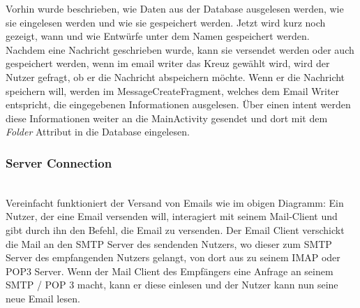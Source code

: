 \documentclass[a4paper,11pt]{article}
\begin{document}
\begingroup
\setlength{\intextsep}{5pt}
\setlength{\columnsep}{4pt}




\nohyphenation

Vorhin wurde beschrieben, wie Daten aus der Database ausgelesen werden, wie sie eingelesen werden und wie sie gespeichert werden. Jetzt wird kurz 
noch gezeigt, wann und wie Entwürfe unter dem Namen  gespeichert werden. \\

Nachdem eine Nachricht geschrieben wurde, kann sie versendet werden oder auch gespeichert werden, wenn im \gls{email writer} das Kreuz gewählt wird, wird der Nutzer 
gefragt, ob er die Nachricht abspeichern möchte. Wenn er die Nachricht speichern will, werden im MessageCreateFragment, welches dem Email Writer entspricht, die
eingegebenen Informationen ausgelesen. Über einen \gls{intent} werden diese Informationen weiter an die MainActivity gesendet und dort 
mit dem \textit{Folder} Attribut  in die Database eingelesen.\\

\endgroup

\vspace*{2cm}
\subsubsection{Server Connection}


\phantom{.} \\ %
Vereinfacht funktioniert der Versand von Emails wie im obigen Diagramm: Ein Nutzer, der eine Email versenden will, interagiert mit seinem Mail-Client und gibt durch ihn den Befehl, die Email zu versenden. Der Email Client verschickt die Mail an den SMTP Server des sendenden Nutzers, wo dieser zum SMTP Server des empfangenden Nutzers gelangt, von dort aus zu seinem IMAP oder POP3 Server. Wenn der Mail Client des Empfängers eine Anfrage an seinem SMTP / POP 3 macht, kann er diese einlesen und der Nutzer kann nun seine neue Email lesen.\\
\end{document}
